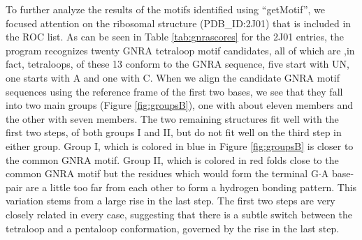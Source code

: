 To  further  analyze  the  results  of  the  motifs  identified  using
``getMotif'',  we   focused  attention  on   the  ribosomal  structure
(PDB\_ID:2J01) that  is included in the  ROC list.  As can  be seen in
Table   \ref{tab:gnrascores}  for  the   2J01  entries,   the  program
recognizes twenty  GNRA tetraloop motif  candidates, all of  which are
,in fact, tetraloops,  of these 13 conform to  the GNRA sequence, five
start with UN,  one starts with A  and one with C.  When  we align the
candidate GNRA motif sequences using  the reference frame of the first
two  bases,  we  see that  they  fall  into  two main  groups  (Figure
\ref{fig:groupsB}), one  with about eleven members and  the other with
seven members.  The  two remaining structures fit well  with the first
two steps, of both  groups I and II, but do not  fit well on the third
step in  either group.  Group  I, which is  colored in blue  in Figure
\ref{fig:groupsB} is closer to the  common GNRA motif. Group II, which
is  colored in  red  folds close  to  the common  GNRA  motif but  the
residues  which would  form  the terminal  G$\cdot$A  base-pair are  a
little  too   far  from  each   other  to  form  a   hydrogen  bonding
pattern. This variation stems from a  large rise in the last step. The
first two  steps are  very closely related  in every  case, suggesting
that there  is a subtle switch  between the tetraloop  and a pentaloop
conformation, governed by the rise in the last step.

